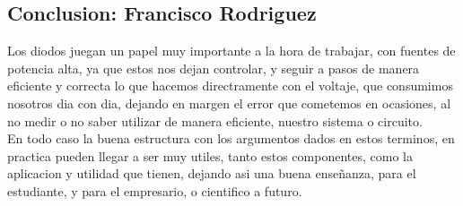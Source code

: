 \documentclass[11pt,a4paper]{article}
\begin{document}
\subsection{Conclusion: Francisco Rodriguez}
Los diodos juegan un papel muy importante a la hora de trabajar, con fuentes de potencia alta, ya que estos nos dejan controlar, y seguir a pasos de manera eficiente y correcta lo que hacemos directramente con el voltaje, que consumimos nosotros dia con dia, dejando en margen el error que cometemos en ocasiones, al no medir o no saber utilizar de manera eficiente, nuestro sistema o circuito.\\
En todo caso la buena estructura con los argumentos dados en estos terminos, en practica pueden llegar a ser muy utiles, tanto estos componentes, como la aplicacion y utilidad que tienen, dejando asi una buena enseñanza, para el estudiante, y para el empresario, o cientifico a futuro.
\end{document}
